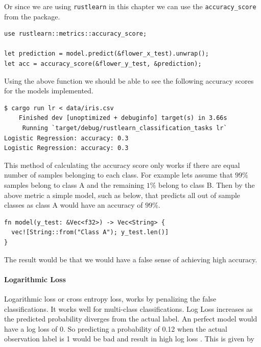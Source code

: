 \documentclass{book}
\begin{document}
Or since we are using \lstinline{rustlearn} in this chapter we can use the \lstinline{accuracy_score} from the package.

\begin{lstlisting}[caption={chapter3\\/rustlearn\_classification\_tasks\\/src\\/logistic\_reg\\.rs}]
use rustlearn::metrics::accuracy_score;

let prediction = model.predict(&flower_x_test).unwrap();
let acc = accuracy_score(&flower_y_test, &prediction);
\end{lstlisting}

Using the above function we should be able to see the following accuracy scores for the models implemented.

\begin{lstlisting}[caption={chapter3\\/rustlearn\_classification\_tasks\\/src\\/logistic\_reg\\.rs}]
$ cargo run lr < data/iris.csv
    Finished dev [unoptimized + debuginfo] target(s) in 3.66s
     Running `target/debug/rustlearn_classification_tasks lr`
Logistic Regression: accuracy: 0.3
Logistic Regression: accuracy: 0.3
\end{lstlisting}

This method of calculating the accuracy score only works if there are equal number of samples belonging to each class. For example lets assume that $99\%$ samples belong to class A and the remaining $1\%$ belong to class B. Then by the above metric a simple model, such as below, that predicts all out of sample classes as class A would have an accuracy of $99\%$.

\begin{lstlisting}[caption={my awesome machine learning model}]
fn model(y_test: &Vec<f32>) -> Vec<String> {
  vec![String::from("Class A"); y_test.len()]
}
\end{lstlisting}

The result would be that we would have a false sense of achieving high accuracy.
\label{par:accuracy}

\paragraph{Logarithmic Loss}%
Logarithmic loss or cross entropy loss, works by penalizing the false classifications. It works well for multi-class classifications. Log Loss increases as the predicted probability diverges from the actual label. An perfect model would have a log loss of 0. So predicting a probability of 0.12 when the actual observation label is 1 would be bad and result in high log loss\cite{WEBSITE:15} . This is given by
\end{document}
